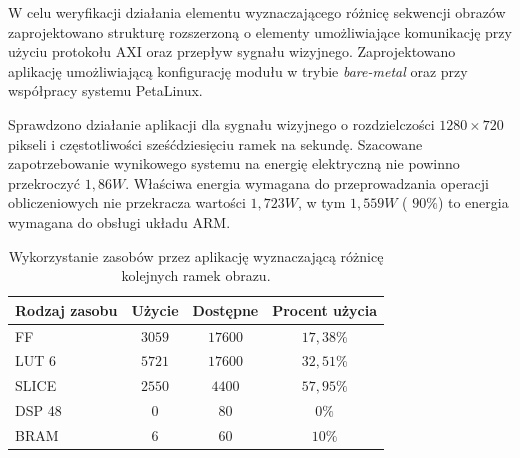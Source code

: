 W celu weryfikacji działania elementu wyznaczającego różnicę sekwencji obrazów zaprojektowano strukturę rozszerzoną o elementy umożliwiające komunikację przy użyciu protokołu AXI oraz przepływ sygnału wizyjnego. 
Zaprojektowano aplikację umożliwiającą konfigurację modułu w trybie \textit{bare-metal} oraz przy współpracy systemu PetaLinux.

Sprawdzono działanie aplikacji dla sygnału wizyjnego o rozdzielczości $1280 \times 720$ pikseli i częstotliwości sześćdziesięciu ramek na sekundę.
Szacowane zapotrzebowanie wynikowego systemu na energię elektryczną nie powinno przekroczyć $1,86W$. Właściwa energia wymagana do przeprowadzania operacji obliczeniowych nie przekracza wartości $1,723W$, w tym $1,559W$ ( $90\%$) to energia wymagana do obsługi układu ARM.

\begin{table}[h]
	\caption{Wykorzystanie zasobów przez aplikację wyznaczającą różnicę kolejnych ramek obrazu.} %
	\centering
	\label{tab;frame-difference-utilization}
	\begin{tabular}{|l|c|c|c|}
		\hline
		\textbf{Rodzaj zasobu} & \textbf{Użycie} & \textbf{Dostępne} & \textbf{Procent użycia}      \\ \hline
		FF                     & $3059$            & $17600$             & $17,38\%$                 \\ \hline
		LUT 6                  & $5721$            & $17600$             & $32,51\%$                 \\ \hline
		SLICE                  & $2550$            & $4400$             & $57,95\%$                 \\ \hline
		DSP 48                 & $0$               & $80$                & $0\%$                    \\ \hline
		BRAM                   & $6$               & $60$                & $10\%$                   \\ \hline
	\end{tabular}
\end{table}

